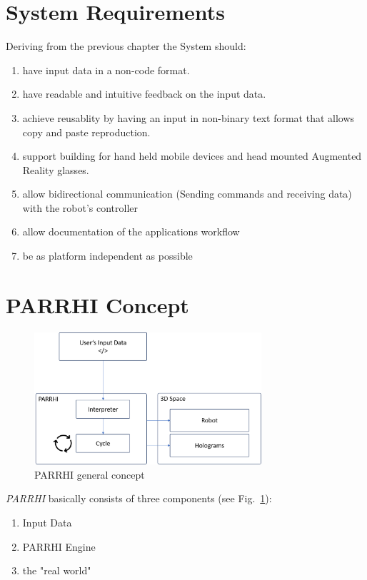 \section{System Requirements}\label{Section:SystemRequirements}
Deriving from the previous chapter the System should:
\begin{enumerate}
	\setlength\itemsep{-1em}
	\item have input data in a non-code format.
	\item have readable and intuitive feedback on the input data.
	\item achieve reusablity by having an input in non-binary text format that allows copy and paste reproduction.
	\item support building for hand held mobile devices and head mounted Augmented Reality glasses.
	\item allow bidirectional communication (Sending commands and receiving data) with the robot's controller 
	\item allow documentation of the applications workflow
	\item be as platform independent as possible
\end{enumerate}

\clearpage
\section{PARRHI Concept}

\begin{figure}[h]
	\centering
	\includegraphics[width=0.75\textwidth]{Figures/PARRHIConcept01.png}
	\caption{PARRHI general concept}
	\label{Fig:PARRHIConcept}
\end{figure}

\textit{PARRHI} basically consists of three components (see Fig.~\ref{Fig:PARRHIConcept}):
\begin{enumerate}
	\setlength\itemsep{-1em}
	\item Input Data
	\item PARRHI Engine
	\item the "real world"
\end{enumerate}

